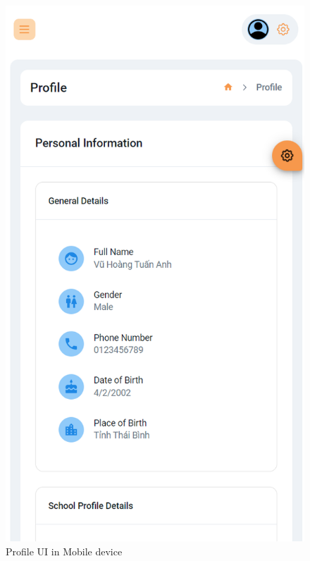 	
	\begin{figure}[H]
		\centering
		\includegraphics[width=0.5\linewidth]{graphics/responsive/res1}
		\caption{Profile UI in Mobile device}
		\label{fig:res1}
	\end{figure}
	

	
	
